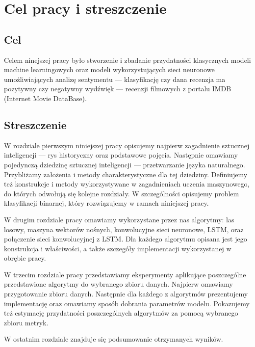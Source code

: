 \chapter*{Cel pracy i streszczenie}

\section*{Cel}

Celem ninejszej pracy było stworzenie i zbadanie przydatności klasycznych modeli machine learningowych oraz modeli wykorzystujących sieci neuronowe umożliwiających analizę sentymentu --- klasyfikację czy dana recenzja ma pozytywny czy negatywny wydźwięk --- recenzji filmowych z portalu IMDB (Internet Movie DataBase).

\section*{Streszczenie}

W rozdziale pierwszym niniejszej pracy opisujemy najpierw zagadnienie sztucznej inteligencji --- rys historyczny oraz podstawowe pojęcia. Następnie omawiamy pojedynczą dziedzinę sztucznej inteligencji --- przetwarzanie języka naturalnego. Przybliżamy założenia i metody charakterystyczne dla tej dziedziny. Definiujemy też konstrukcje i metody wykorzystywane w zagadnieniach uczenia maszynowego, do których odwołują się kolejne rozdziały. W szczególności opisujemy problem klasyfikacji binarnej, który rozwiązujemy w ramach niniejszej pracy.

W drugim rozdziale pracy omawiamy wykorzystane przez nas algorytmy: las losowy, maszyna wektorów nośnych, konwolucyjne sieci neuronowe, LSTM, oraz połączenie sieci konwolucyjnej z LSTM. Dla każdego algorytmu opisana jest jego konstrukcja i właściwości, a także szczegóły implementacji wykorzystanej w obrębie pracy.

W trzecim rozdziale pracy przedstawiamy eksperymenty aplikujące poszczególne przedstawione algorytmy do wybranego zbioru danych. Najpierw omawiamy przygotowanie zbioru danych. Następnie dla każdego z algorytmów prezentujemy implementację oraz omawiamy sposób dobrania parametrów modelu. Pokazujemy też estymację przydatności poszczególnych algorytmów za pomocą wybranego zbioru metryk.

W ostatnim rozdziale znajduje się podsumowanie otrzymanych wyników.